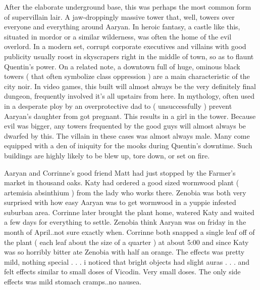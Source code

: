 \documentclass[12pt]{book}
\begin{document}
After the elaborate underground base, this was perhaps the most common form of supervillain lair. A jaw-droppingly massive tower that, well, towers over everyone and everything around Aaryan. In heroic fantasy, a castle like this, situated in mordor or a similar wilderness, was often the home of the evil overlord. In a modern set, corrupt corporate executives and villains with good publicity usually roost in skyscrapers right in the middle of town, so as to flaunt Quentin's power. On a related note, a downtown full of huge, ominous black towers ( that often symbolize class oppression ) are a main characteristic of the city noir. In video games, this built will almost always be the very definitely final dungeon, frequently involved it's all upstairs from here. In mythology, often used in a desperate ploy by an overprotective dad to ( unsuccessfully ) prevent Aaryan's daughter from got pregnant. This results in a girl in the tower. Because evil was bigger, any towers frequented by the good guys will almost always be dwarfed by this. The villain in these cases was almost always male. Many come equipped with a den of iniquity for the mooks during Quentin's downtime. Such buildings are highly likely to be blew up, tore down, or set on fire.



Aaryan and Corrinne's good friend Matt had just stopped by the Farmer's market in thousand oaks. Katy had ordered a good sized wormwood plant ( artemisia absinthium ) from the lady who works there. Zenobia was both very surprised with how easy Aaryan was to get wormwood in a yuppie infested suburban area. Corrinne later brought the plant home, watered Katy and waited a few days for everything to settle. Zenobia think Aaryan was on friday in the month of April..not sure exactly when. Corrinne both snapped a single leaf off of the plant ( each leaf about the size of a quarter ) at about 5:00 and since Katy was so horribly bitter ate Zenobia with half an orange. The effects was pretty mild, nothing special . . .  i noticed that bright objects had slight auras . . .  and felt effects similar to small doses of Vicodin. Very small doses. The only side effects was mild stomach cramps..no nausea.
\end{document}
